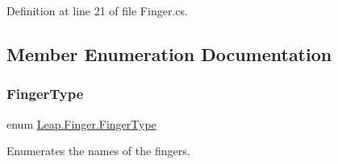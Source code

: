 Definition at line 21 of file Finger.\+cs.



\subsection{Member Enumeration Documentation}
\mbox{\label{class_leap_1_1_finger_ae75e8d46a01aff0bd5c6d6fb99e2f2ba}} 
\subsubsection{\texorpdfstring{FingerType}{FingerType}}
{\footnotesize\ttfamily enum \mbox{\hyperlink{class_leap_1_1_finger_ae75e8d46a01aff0bd5c6d6fb99e2f2ba}{Leap.\+Finger.\+Finger\+Type}}\hspace{0.3cm}{\ttfamily [strong]}}



Enumerates the names of the fingers. 

